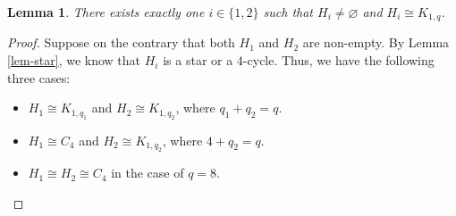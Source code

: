 \documentclass[11pt]{article}
\newtheorem{lemma}[theorem]{Lemma}
\begin{document}
\begin{lemma}
There exists exactly one $i\in \{1,2\}$ such that 
$H_i\neq \varnothing$ and 
$H_i\cong K_{1,q}$. 
\end{lemma}



\begin{proof} 
Suppose on the contrary that 
 both $H_1$ and $H_2$ are non-empty. 
By Lemma \ref{lem-star}, 
we know that $H_i$ is a star or a $4$-cycle. 
Thus, we have the following three cases: 
\begin{itemize}
\item[(a)]  $H_1\cong K_{1,q_1}$ and $H_2\cong 
K_{1,q_2}$, where $q_1+q_2=q$.  

\item[(b)] $H_1\cong C_4$ and $H_2\cong K_{1,q_2}$, where $4+q_2 =q$. 

\item[(c)]  $H_1\cong H_2\cong C_4$ in the case of $q=8$.


\end{itemize}
\end{proof}
\end{document}
